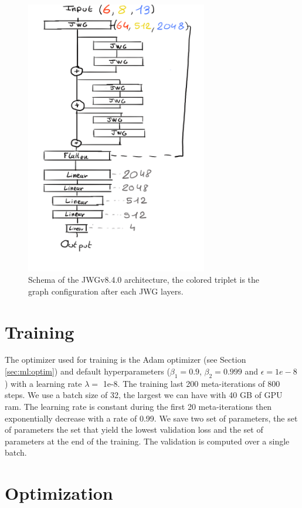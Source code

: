 \documentclass[../main.tex]{subfiles}
\begin{document}
\begin{figure}
  \centering
  \includegraphics[height=12cm]{images/jgnn/jwgv8_4.png}
  \caption{Schema of the JWGv8.4.0 architecture, the colored triplet is the graph configuration after each JWG layers.}
  \label{fig:jgnn:model-schematic}
\end{figure}


\section{Training}

The optimizer used for training is the Adam optimizer (see Section \ref{sec:ml:optim}) and default hyperparameters ($\beta_1= 0.9$, $\beta_2 = 0.999$ and $\epsilon = 1e-8$) with a learning rate $\lambda = $ 1e-8. The training last 200 meta-iterations of 800 steps. We use a batch size of 32, the largest we can have with 40 GB of GPU ram. The learning rate is constant during the first 20 meta-iterations then exponentially decrease with a rate of 0.99. We save two set of parameters, the set of parameters the set that yield the lowest validation loss and the set of parameters at the end of the training. The validation is computed over a single batch.

\section{Optimization}
\end{document}
